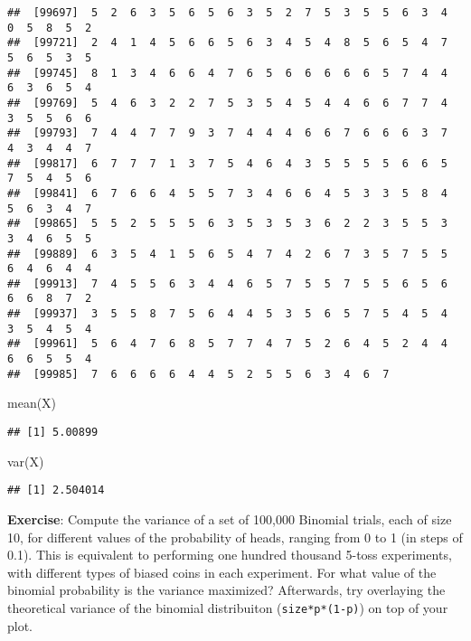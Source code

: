 \documentclass[
]{book}
\newenvironment{Shaded}{\begin{snugshade}}{\end{snugshade}}
\newcommand{\FunctionTok}[1]{\textcolor[rgb]{0.00,0.00,0.00}{#1}}
\newcommand{\NormalTok}[1]{#1}
\begin{document}
\begin{verbatim}
##  [99697]  5  2  6  3  5  6  5  6  3  5  2  7  5  3  5  5  6  3  4  0  5  8  5  2
##  [99721]  2  4  1  4  5  6  6  5  6  3  4  5  4  8  5  6  5  4  7  5  6  5  3  5
##  [99745]  8  1  3  4  6  6  4  7  6  5  6  6  6  6  6  5  7  4  4  6  3  6  5  4
##  [99769]  5  4  6  3  2  2  7  5  3  5  4  5  4  4  6  6  7  7  4  3  5  5  6  6
##  [99793]  7  4  4  7  7  9  3  7  4  4  4  6  6  7  6  6  6  3  7  4  3  4  4  7
##  [99817]  6  7  7  7  1  3  7  5  4  6  4  3  5  5  5  5  6  6  5  7  5  4  5  6
##  [99841]  6  7  6  6  4  5  5  7  3  4  6  6  4  5  3  3  5  8  4  5  6  3  4  7
##  [99865]  5  5  2  5  5  5  6  3  5  3  5  3  6  2  2  3  5  5  3  3  4  6  5  5
##  [99889]  6  3  5  4  1  5  6  5  4  7  4  2  6  7  3  5  7  5  5  6  4  6  4  4
##  [99913]  7  4  5  5  6  3  4  4  6  5  7  5  5  7  5  5  6  5  6  6  6  8  7  2
##  [99937]  3  5  5  8  7  5  6  4  4  5  3  5  6  5  7  5  4  5  4  3  5  4  5  4
##  [99961]  5  6  4  7  6  8  5  7  7  4  7  5  2  6  4  5  2  4  4  6  6  5  5  4
##  [99985]  7  6  6  6  6  4  4  5  2  5  5  6  3  4  6  7
\end{verbatim}

\begin{Shaded}
\begin{Highlighting}[]
\FunctionTok{mean}\NormalTok{(X)}
\end{Highlighting}
\end{Shaded}

\begin{verbatim}
## [1] 5.00899
\end{verbatim}

\begin{Shaded}
\begin{Highlighting}[]
\FunctionTok{var}\NormalTok{(X)}
\end{Highlighting}
\end{Shaded}

\begin{verbatim}
## [1] 2.504014
\end{verbatim}

\textbf{Exercise}: Compute the variance of a set of 100,000 Binomial trials, each of size 10, for different values of the probability of heads, ranging from 0 to 1 (in steps of 0.1). This is equivalent to performing one hundred thousand 5-toss experiments, with different types of biased coins in each experiment. For what value of the binomial probability is the variance maximized? Afterwards, try overlaying the theoretical variance of the binomial distribuiton (\texttt{size*p*(1-p)}) on top of your plot.
\end{document}
